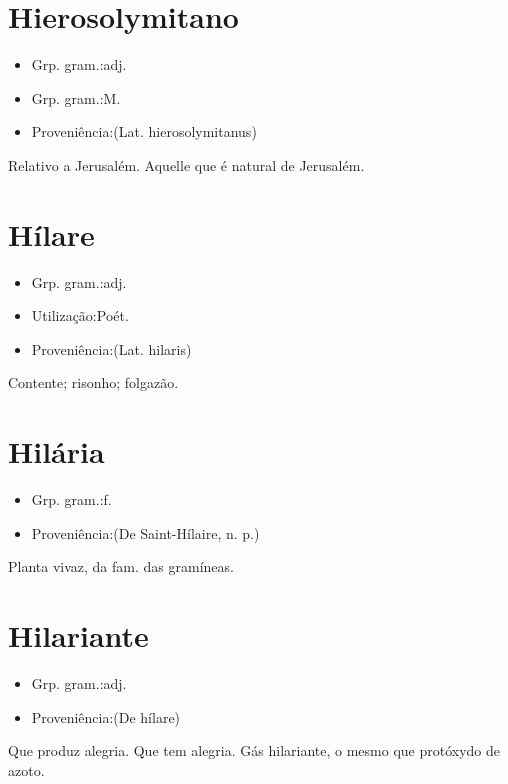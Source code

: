 \documentclass{article}
\begin{document}
\section{Hierosolymitano}
\begin{itemize}
\item {Grp. gram.:adj.}
\end{itemize}
\begin{itemize}
\item {Grp. gram.:M.}
\end{itemize}
\begin{itemize}
\item {Proveniência:(Lat. \textunderscore hierosolymitanus\textunderscore )}
\end{itemize}
Relativo a Jerusalém.
Aquelle que é natural de Jerusalém.
\section{Hílare}
\begin{itemize}
\item {Grp. gram.:adj.}
\end{itemize}
\begin{itemize}
\item {Utilização:Poét.}
\end{itemize}
\begin{itemize}
\item {Proveniência:(Lat. \textunderscore hilaris\textunderscore )}
\end{itemize}
Contente; risonho; folgazão.
\section{Hilária}
\begin{itemize}
\item {Grp. gram.:f.}
\end{itemize}
\begin{itemize}
\item {Proveniência:(De \textunderscore Saint-Hílaire\textunderscore , n. p.)}
\end{itemize}
Planta vivaz, da fam. das gramíneas.
\section{Hilariante}
\begin{itemize}
\item {Grp. gram.:adj.}
\end{itemize}
\begin{itemize}
\item {Proveniência:(De \textunderscore hílare\textunderscore )}
\end{itemize}
Que produz alegria.
Que tem alegria.
\textunderscore Gás hilariante\textunderscore , o mesmo que \textunderscore protóxydo de azoto\textunderscore .
\end{document}
